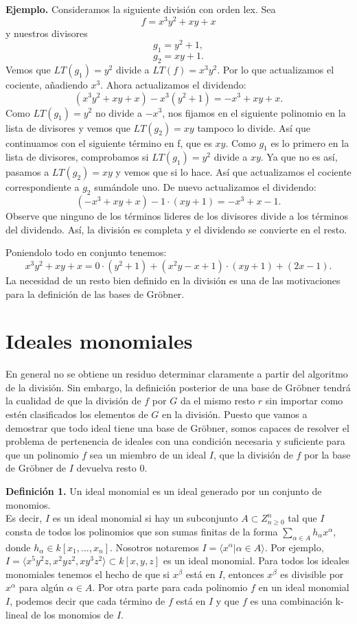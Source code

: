 \textbf{Ejemplo.} Consideramos la siguiente división con orden lex. Sea 
\[
f = x^{3}y^{2} + xy + x
\]
y nuestros divisores
\[
g_{1} = y^{2} + 1,
\]
\[
g_{2} = xy + 1.
\]
Vemos que $LT(g_{1}) = y^{2}$ divide a $LT(f) = x^{3}y^{2}$. Por lo que actualizamos el cociente, añadiendo $x^{3}$. Ahora actualizamos el dividendo:
\[
(x^{3}y^{2} + xy + x) - x^{3}(y^{2}+1)=-x^{3}+xy+x.
\]
Como $LT(g_{1}) = y^{2}$ no divide a $-x^{3}$, nos fijamos en el siguiente polinomio en la lista de divisores y vemos que $LT(g_{2}) = xy$ tampoco lo divide. Así que continuamos con el siguiente término en f, que es $xy$. Como $g_{1}$ es lo primero en la lista de divisores, comprobamos si $LT(g_{1}) = y^{2}$ divide a $xy$. Ya que no es así, pasamos a $LT(g_{2}) = xy$ y vemos que si lo hace. Así que actualizamos el cociente correspondiente a $g_{2}$ sumándole uno. De nuevo actualizamos el dividendo:
\[
(-x^{3} + xy + x) -1\cdot(xy+1)=-x^{3}+x-1.
\]
Observe que ninguno de los términos lideres de los divisores divide a los términos del dividendo.
Así, la división es completa y el dividendo se convierte en el resto.

Poniendolo todo en conjunto tenemos:
\[
x^{3}y^{2} + xy + x = 0\cdot(y^{2}+1)+ (x^{2}y-x+1)\cdot(xy+1)+(2x-1).
\]
La necesidad de un resto bien definido en la división es una de las motivaciones para la definición de las bases de Gröbner.


\section{Ideales monomiales}

En general no se obtiene un residuo determinar claramente a partir del algoritmo de la división. Sin embargo, la definición posterior de una base de Gröbner tendrá la cualidad de que la división de $f$ por $G$ da el mismo resto $r$ sin importar como estén clasificados los elementos de $G$ en la división. Puesto que vamos a demostrar que todo ideal tiene una base de Gröbner, somos capaces de resolver el problema de pertenencia de ideales con una condición necesaria y suficiente para que un polinomio $f$ sea un miembro de un ideal $I$, que la división de $f$ por la base de Gröbner de $I$ devuelva resto $0$.

\textbf{Definición 1.} Un ideal monomial es un ideal generado por un conjunto de monomios.
\\

Es decir, $I$ es un ideal monomial si hay un subconjunto $A \subset Z^{n}_{n\geq0}$ tal que $I$ consta de todos los polinomios que son sumas finitas de la forma $\sum_{\alpha\in A}h_{\alpha}x^{\alpha}$, donde $h_{\alpha}\in k[x_{1},\dots,x_{n}]$. Nosotros notaremos $I = \langle x^{\alpha}|\alpha\in A \rangle$.
Por ejemplo, $I = \langle x^{5}y^{2}z,x^{2}yz^{2},xy^{3}z^{2} \rangle \subset k[x,y,z]$ es un ideal monomial.
Para todos los ideales monomiales tenemos el hecho de que si $x^{\beta}$ está en $I$, entonces $x^{\beta}$ es divisible por $x^{\alpha}$ para algún $\alpha \in A$. Por otra parte para cada polinomio $f$ en un ideal monomial $I$, podemos decir que cada término de $f$ está en $I$ y que $f$ es una combinación k-lineal de los monomios de $I$.

